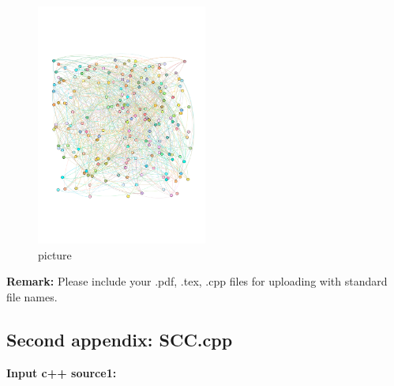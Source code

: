 \documentclass[12pt,a4paper]{article}
\makeatletter
\newtheorem*{solution}{Solution}
\theoremstyle{definition}
\renewenvironment{solution}[1][Solution] {\par\pushQED{\qed}\normalfont\topsep6\p@\@plus6\p@\relax\trivlist\item[\hskip\labelsep\bfseries#1\@addpunct{.}]\ignorespaces}{\popQED\endtrivlist\@endpefalse} \makeatother
\makeatother
\begin{document}
    \begin{solution}
        \begin{figure}[H] %
    \centering %
    \includegraphics[width=0.5\textwidth]{gephi.pdf}
    \caption{picture} %
    \label{} %
    \end{figure}
    
    \end{solution}


\textbf{Remark:} Please include your .pdf, .tex, .cpp files for uploading with standard file names.
\newpage


\begin{appendices}
\section{Second appendix: SCC.cpp}
\textcolor[rgb]{0.98,0.00,0.00}{\textbf{Input c++ source1:}}


\end{appendices}



\end{document}
